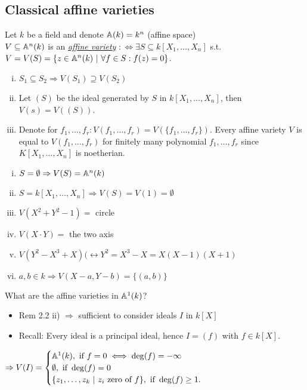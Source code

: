 \subsection{Classical affine varieties}
\begin{defi}
Let $k$ be a field and denote $\mathbb{A}(k)=k^n$ (\glqq affine space\grqq)\\
$V\subseteq \mathbb{A}^n(k)$ is an \emph{\underline{affine variety}} $: \iff \exists S \subseteq k[X_1, \dots, X_n]$ s.t. $V=V(S)=\{z \in \mathbb{A}^n(k) \ | \ \forall f \in S: f(z)=0\}$.
\end{defi}

\begin{Bem}
\begin{enumerate}[i)]
\item $S_1 \subseteq S_2 \Rightarrow V(S_1) \supseteq V(S_2)$
\item Let $(S)$ be the ideal generated by $S$ in $k[X_1, \dots, X_n]$, then $V(s)=V( (S) )$.
\item Denote for $f_1, \dots, f_r: V(f_1, \dots, f_r)=V(\{f_1, \dots, f_r\})$. Every affine variety $V$ is equal to $V(f_1, \dots, f_r)$ for finitely many polynomial $f_1, \dots, f_r$ since $K[X_1, \dots, X_n]$ is noetherian.
\end{enumerate}
\end{Bem}

\begin{Bsp}
\begin{enumerate}[i)]
\item $S= \emptyset \Rightarrow V(S)=\mathbb{A}^n(k)$
\item $S=k[X_1, \dots, X_n] \Rightarrow V(S)=V(1)=\emptyset$
\item $V(X^2+Y^2-1) = $ circle 
\item $V(X \cdot Y) = $ the two axis 
\item $V(Y^2-X^3+X) (\leftrightarrow Y^2=X^3-X=X(X-1)(X+1)$ 
\item $a,b \in k \Rightarrow V(X-a, Y-b)=\{(a,b)\}$
\end{enumerate}
\end{Bsp}

\begin{Bsp}
What are the affine varieties in $\mathbb{A}^1(k)$?
\begin{itemize}
\item Rem 2.2 ii) $\Rightarrow$ sufficient to consider ideals $I$ in $k[X]$
\item Recall: Every ideal is a principal ideal, hence $I=(f)$ with $f \in k[X]$.
\end{itemize}
$\Rightarrow V(I)=\begin{cases}
\mathbb{A}^1(k), \text{ if } f = 0 \iff \deg(f)=-\infty\\
\emptyset, \text{ if } \deg(f)=0\\
\{z_1, \dots, z_k \ | \ z_i \text{ zero of } f\}, \text{ if } \deg(f) \geq 1.
\end{cases}$
\end{Bsp}

